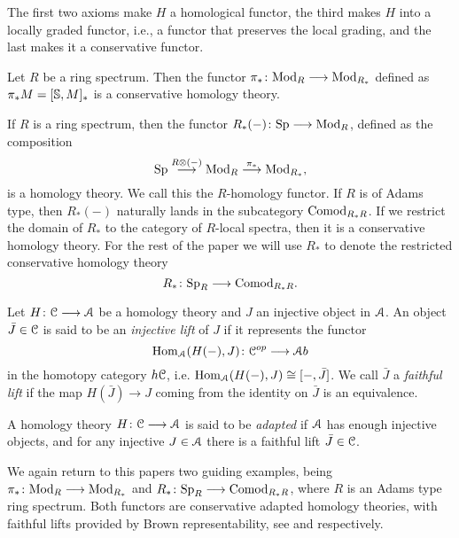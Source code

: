 \begin{remark}
    The first two axioms make $H$ a homological functor, the third makes $H$ into a locally graded functor, i.e., a functor that preserves the local grading, and the last makes it a conservative functor. 
\end{remark}

\begin{example}
    Let $R$ be a ring spectrum. Then the functor $\pi_*\: \Mod_R\longrightarrow \Mod_{R_*}$ defined as $\pi_* M = [\S, M]_*$ is a conservative homology theory. 
\end{example}

\begin{example}
    If $R$ is a ring spectrum, then the functor $R_*(-)\: \Sp \longrightarrow \Mod_R$, defined as the composition 
    $$\Sp\overset{R\otimes (-)}\longrightarrow \Mod_R \overset{\pi_*}\longrightarrow \Mod_{R_*},$$
    is a homology theory. We call this the $R$-homology functor. If $R$ is of Adams type, then $R_*(-)$ naturally lands in the subcategory $\Comod_{R_*R}$. If we restrict the domain of $R_*$ to the category of $R$-local spectra, then it is a conservative homology theory. For the rest of the paper we will use $R_*$ to denote the restricted conservative homology theory 
    \[R_*\: \Sp_R\to \Comod_{R_*R}.\]
\end{example}

\begin{definition}
    \label{ch1:def:faithful-lift}
    Let $H\: \C\longrightarrow \A$ be a homology theory and $J$ an injective object in $\A$. An object $\bar{J}\in \C$ is said to be an \emph{injective lift} of $J$ if it represents the functor 
    $$\Hom_\A(H(-),J)\: \C^{op}\longrightarrow \A b$$
    in the homotopy category $h \C$, i.e. $\Hom_\A(H(-),J)\cong [-,\bar{J}]$. We call $\bar{J}$ a \emph{faithful lift} if the map $H(\bar{J})\longrightarrow J$ coming from the identity on $\bar{J}$ is an equivalence. 
\end{definition}

\begin{definition}
    \label{ch1:def:adapted-homology-theory}
    A homology theory $H\: \C\longrightarrow \A$ is said to be \emph{adapted} if $\A$ has enough injective objects, and for any injective $J \in \A$ there is a faithful lift $\bar{J}\in \C$. 
\end{definition}

\begin{example}
    We again return to this papers two guiding examples, being $\pi_*\: \Mod_R\longrightarrow \Mod_{R_*}$ and $R_*\: \Sp_R\longrightarrow \Comod_{R_*R}$, where $R$ is an Adams type ring spectrum. Both functors are conservative adapted homology theories, with faithful lifts provided by Brown representability, see \cite[8.2]{patchkoria-pstragowski_2021} and \cite[8.13]{patchkoria-pstragowski_2021} respectively. 
\end{example}


